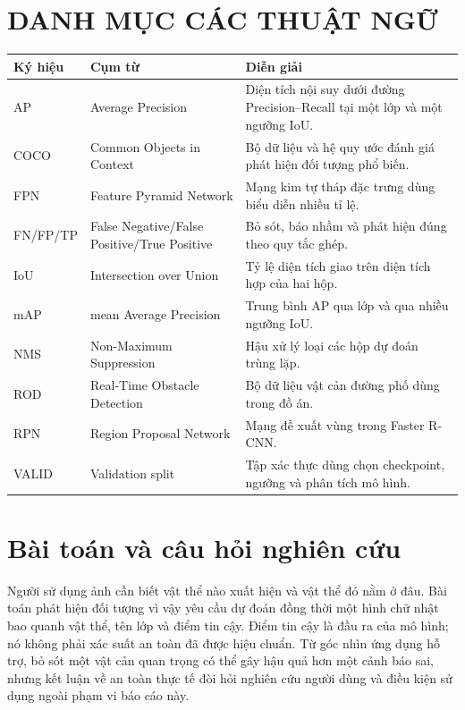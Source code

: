 \documentclass[12pt,a4paper,oneside]{report}
\begin{document}
\chapter*{DANH MỤC CÁC THUẬT NGỮ}
\begin{longtable}{p{2.4cm}p{4.6cm}p{7.2cm}}
\toprule Ký hiệu & Cụm từ & Diễn giải\\\midrule
AP & Average Precision & Diện tích nội suy dưới đường Precision--Recall tại một lớp và một ngưỡng IoU.\\
COCO & Common Objects in Context & Bộ dữ liệu và hệ quy ước đánh giá phát hiện đối tượng phổ biến.\\
FPN & Feature Pyramid Network & Mạng kim tự tháp đặc trưng dùng biểu diễn nhiều tỉ lệ.\\
FN/FP/TP & False Negative/False Positive/True Positive & Bỏ sót, báo nhầm và phát hiện đúng theo quy tắc ghép.\\
IoU & Intersection over Union & Tỷ lệ diện tích giao trên diện tích hợp của hai hộp.\\
mAP & mean Average Precision & Trung bình AP qua lớp và qua nhiều ngưỡng IoU.\\
NMS & Non-Maximum Suppression & Hậu xử lý loại các hộp dự đoán trùng lặp.\\
ROD & Real-Time Obstacle Detection & Bộ dữ liệu vật cản đường phố dùng trong đồ án.\\
RPN & Region Proposal Network & Mạng đề xuất vùng trong Faster R-CNN.\\
VALID & Validation split & Tập xác thực dùng chọn checkpoint, ngưỡng và phân tích mô hình.\\
\bottomrule
\end{longtable}
\clearpage

\chapter{Bài toán và câu hỏi nghiên cứu}\label{chap:intro}
Người sử dụng ảnh cần biết vật thể nào xuất hiện và vật thể đó nằm ở đâu. Bài toán phát hiện đối tượng vì vậy yêu cầu dự đoán đồng thời một hình chữ nhật bao quanh vật thể, tên lớp và điểm tin cậy. Điểm tin cậy là đầu ra của mô hình; nó không phải xác suất an toàn đã được hiệu chuẩn. Từ góc nhìn ứng dụng hỗ trợ, bỏ sót một vật cản quan trọng có thể gây hậu quả hơn một cảnh báo sai, nhưng kết luận về an toàn thực tế đòi hỏi nghiên cứu người dùng và điều kiện sử dụng ngoài phạm vi báo cáo này.
\end{document}
